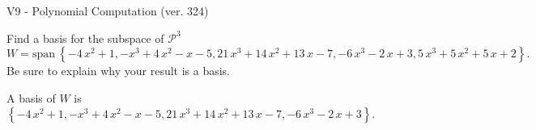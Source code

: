\begin{exercise}
  \begin{exerciseTitle}V9 - Polynomial Computation (ver. 324)\end{exerciseTitle}
  \begin{exerciseStatement}
    Find a basis for the subspace of \(\mathcal{P}^3\) 
\[W=\mathrm{span}\ \left\{-4 \, x^{2} + 1 , -x^{3} + 4 \, x^{2} - x - 5 , 21 \, x^{3} + 14 \, x^{2} + 13 \, x - 7 , -6 \, x^{3} - 2 \, x + 3 , 5 \, x^{3} + 5 \, x^{2} + 5 \, x + 2\right\}.\]
 Be sure to explain why your result is a basis.


  \end{exerciseStatement}
  \begin{exerciseAnswer}
   A basis of \(W\) is  \(\left\{-4 \, x^{2} + 1 , -x^{3} + 4 \, x^{2} - x - 5 , 21 \, x^{3} + 14 \, x^{2} + 13 \, x - 7 , -6 \, x^{3} - 2 \, x + 3\right\}\).
  


  \end{exerciseAnswer}
\end{exercise}